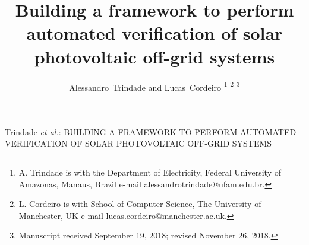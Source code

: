\documentclass[journal]{IEEEtran}
\begin{document}
%
\title{Building a framework to perform automated verification of solar photovoltaic off-grid systems}
%
%
%

\author{Alessandro~Trindade and Lucas~Cordeiro%
\thanks{A. Trindade is with the Department of Electricity, Federal University of Amazonas, Manaus, Brazil e-mail alessandrotrindade@ufam.edu.br.}%
\thanks{L. Cordeiro is with School of Computer Science, The University of Manchester, UK e-mail lucas.cordeiro@manchester.ac.uk.}%
\thanks{Manuscript received September 19, 2018; revised November 26, 2018.}}

% 
%



{Trindade \MakeLowercase{\textit{et al.}}: BUILDING A FRAMEWORK TO PERFORM AUTOMATED VERIFICATION OF SOLAR PHOTOVOLTAIC OFF-GRID SYSTEMS}
% 
\end{document}
